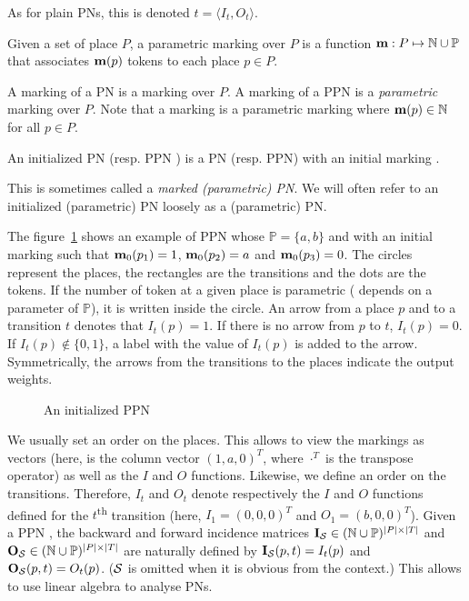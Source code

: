 As for plain \acp{PN}, this is denoted $t = \langle I_t, O_t \rangle$.

\begin{defi}
  Given a set of place $P$, a parametric marking over $P$ is a function $\mathbf{m} : P \mapsto \mathbb{N} \cup \mathbb{P} $ that associates $\mathbf{m}(p)$ tokens to each place $p \in P$.
\end{defi}

A marking of a \ac{PN} \NPT is a marking over $P$.
A marking of a \ac{PPN} \SPTP is a \emph{parametric} marking over $P$.
Note that a marking \marq is a parametric marking where $\mathbf{m}(p) \in \mathbb{N}$ for all $p \in P$.

\begin{defi}
  An initialized \ac{PN} \NPTm (resp. \ac{PPN} \SPTPm) is a \ac{PN} (resp. \ac{PPN}) with an initial marking \marqi.
\end{defi}

This is sometimes called a \emph{marked (parametric) \ac{PN}}.
We will often refer to an initialized (parametric) \ac{PN} loosely as a (parametric) \ac{PN}.

The figure~\ref{fig:parametric-petri-net-example} shows an example of \ac{PPN} whose $\mathbb{P} = \{a, b\}$ and with an initial marking \marqi such that $\mathbf{m}_0(p_1) = 1$, $\mathbf{m}_0(p_2) = a$ and $\mathbf{m}_0(p_3) = 0$. The circles represent the places, the rectangles are the transitions and the dots are the tokens. If the number of token at a given place is parametric ( depends on a parameter of $\mathbb{P}$), it is written inside the circle. An arrow from a place $p$ and to a transition $t$ denotes that $I_t(p) = 1$. If there is no arrow from $p$ to $t$, $I_t(p) = 0$. If $I_t(p) \notin \{0, 1\}$, a label with the value of $I_t(p)$ is added to the arrow.
Symmetrically, the arrows from the transitions to the places indicate the output weights.

\begin{figure}[h]
  \centering
  
  \par
  \caption{An initialized \ac{PPN}}
  \label{fig:parametric-petri-net-example}
\end{figure}

We usually set an order on the places.
This allows to view the markings as vectors (here, \marqi is the column vector $(1, a, 0)^T$, where $\cdot^T$ is the transpose operator) as well as the $I$ and $O$ functions.
Likewise, we define an order on the transitions.
Therefore, $I_t$ and $O_t$ denote respectively the $I$ and $O$ functions defined for the $t$\textsuperscript{th} transition (here, $I_1 = (0, 0, 0)^T$ and $O_1 = (b, 0, 0)^T$).
Given a \ac{PPN} \SPTP, the backward and forward incidence matrices $\mathbf{I}_\mathcal{S} \in (\mathbb{N} \cup \mathbb{P})^{|P|\times|T|}$ and $\mathbf{O}_\mathcal{S} \in (\mathbb{N} \cup \mathbb{P})^{|P|\times|T|}$ are naturally defined by $\mathbf{I}_\mathcal{S}(p, t) = I_t(p)$ and $\mathbf{O}_\mathcal{S}(p, t) = O_t(p)$.
($\mathcal{S}$ is omitted when it is obvious from the context.)
This allows to use linear algebra to analyse \acp{PN}.


